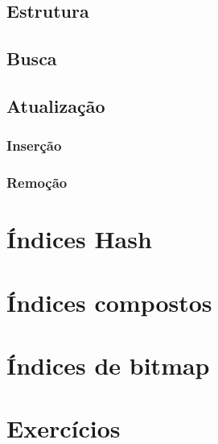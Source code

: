 \subsection{Estrutura}

\subsection{Busca}

\subsection{Atualização}

\subsubsection{Inserção}

\subsubsection{Remoção}

\section{Índices Hash}

\section{Índices compostos}

\section{Índices de bitmap}

\section{Exercícios}

